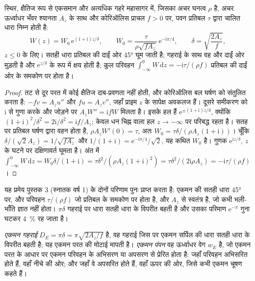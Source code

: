 \begin{theorem}\label{thm:b3:ocean-dynamics:ekman}
स्थिर, क्षैतिज रूप से एकसमान और अत्यधिक गहरे महासागर में, जिसका अचर
घनत्व $\rho$ है, अचर ऊर्ध्वाधर भँवर श्यानता $A_z$ के साथ और कोरिऑलिस
प्राचल $f > 0$ पर, पवन प्रतिबल $\tau$ द्वारा चालित धारा निम्न होती है:
\[
W(z) = W_0\,\mathrm e^{(1+\mathrm i)z/\delta},\qquad
W_0 = \frac{\tau}{\rho\sqrt{fA_z}}\,\mathrm e^{-\mathrm i\pi/4},\qquad
\delta = \sqrt{\frac{2A_z}{f}} ,
\]
$z \le 0$ के लिए। सतही धारा प्रतिबल की दाईं ओर \ang{45} घूम जाती है;
गहराई के साथ वह और दाईं ओर मुड़ती है और $\mathrm
e^{z/\delta}$ के रूप में क्षय होती है; कुल परिवहन $\int_{-\infty}^0 W\,\mathrm dz =
-\mathrm i\tau/(\rho f)$ प्रतिबल की दाईं ओर के समकोण पर होता है।
\end{theorem}

\begin{proof}
तट से दूर परत में कोई क्षैतिज दाब-प्रवणता नहीं होती,
और कोरिऑलिस बल घर्षण को संतुलित करता है: $-fv = A_z u''$ और $fu =
A_z v''$, जहाँ प्राइम $z$ के सापेक्ष अवकलज हैं। दूसरे समीकरण को
$\mathrm i$ से गुणा करके और जोड़ने पर $A_zW'' = \mathrm ifW$ मिलता है। इसके हल हैं
$\mathrm e^{\pm(1+\mathrm i)z/\delta}$, क्योंकि $(1+\mathrm i)^2/\delta^2 =
2\mathrm i/\delta^2 = \mathrm if/A_z$; केवल धन चिह्न वाला हल
$z \to -\infty$ पर परिबद्ध रहता है। सतह पर प्रतिबल घर्षण द्वारा वहन होता है,
$\rho A_zW'(0) = \tau$, अतः $W_0 = \tau\delta/(\rho A_z(1+\mathrm i))$।
चूँकि $\delta/(\sqrt2 A_z) = 1/\sqrt{fA_z}$ और $1/(1+\mathrm i) = \mathrm
e^{-\mathrm i\pi/4}/\sqrt2$, यह कथित $W_0$ है। गुणक
$\mathrm e^{\mathrm iz/\delta}$, $z$ के घटने पर दक्षिणावर्त घूमता है। अंत में
$\int_{-\infty}^0 W\,\mathrm dz = W_0\delta/(1+\mathrm i) =
\tau\delta^2/(\rho A_z(1+\mathrm i)^2) = \tau\delta^2/(2\mathrm i\rho A_z)
= -\mathrm i\tau/(\rho f)$।
\end{proof}

यह प्रमेय पुस्तक 3 (स्नातक वर्ष 1) के दोनों परिणाम पुनः प्राप्त करता है: एकमन की सतही
धारा \ang{45} पर, और परिवहन $\tau/(\rho f)$ जो प्रतिबल के समकोण पर होता है,
और $A_z$ से स्वतंत्र है, जो कभी भली-भाँति ज्ञात नहीं होता।
$\pi\delta$ गहराई पर धारा सतही धारा के विपरीत बहती है और उसका परिमाण
$\mathrm e^{-\pi}$ गुना घटकर \qty{4}{\percent} रह जाता है।

\begin{definition}\label{def:b3:ocean-dynamics:ekman-pumping}
\emph{एकमन गहराई} $D_E = \pi\delta =
\pi\sqrt{2A_z/f}$ है, वह गहराई जिस पर एकमन सर्पिल की धारा
सतही धारा के विपरीत बहती है; यह
एकमन परत की मोटाई मापती है। \emph{एकमन पंपन} वह ऊर्ध्वाधर
वेग $w_E$ है, जो एकमन परत के आधार पर एकमन परिवहन के अभिसरण या
अपसरण से प्रेरित होता है: जहाँ परिवहन अभिसरित होते हैं, वहाँ नीचे की ओर;
और जहाँ वे अपसरित होते हैं, वहाँ ऊपर की ओर, जिसे कभी एकमन चूषण कहते हैं।
\end{definition}

